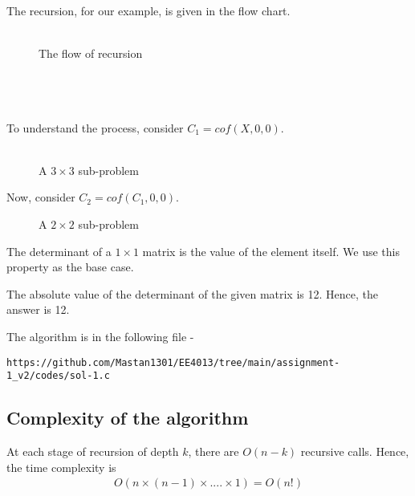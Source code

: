\documentclass[journal,12pt,twocolumn]{IEEEtran}
\begin{document}
The recursion, for our example, is given in the flow chart. \\ \\

\begin{figure}[h!]
	\begin{center}
		\resizebox{\columnwidth/1}{!}{}
	\end{center}
	\caption{The flow of recursion}
	\label{fig:fig1}
\end{figure}

\\ \\ \\ To understand the process, consider $C_1 = cof(X, 0, 0)$. \\ \\

\begin{figure}[h!]
	\begin{center}
		\resizebox{\columnwidth/1}{!}{}
	\end{center}
	\caption{A $3 \times 3$ sub-problem}
	\label{fig:fig2}
\end{figure}

Now, consider $C_2 = cof(C_1, 0, 0)$. 

\begin{figure}[h!]
	\begin{center}
		\resizebox{\columnwidth/1}{!}{}
	\end{center}
	\caption{A $2 \times 2$ sub-problem}
	\label{fig:fig3}
\end{figure}

The determinant of a $1 \times 1$ matrix is the value of the element itself. We use this property as the base case.

The absolute value of the determinant of the given matrix is 12. Hence, the answer is 12.

The algorithm is in the following file - 
\begin{lstlisting}
https://github.com/Mastan1301/EE4013/tree/main/assignment-1_v2/codes/sol-1.c
\end{lstlisting}

\subsection{Complexity of the algorithm}
At each stage of recursion of depth $k$, there are $O(n - k)$ recursive calls. Hence, the time complexity is 
    \begin{align*}
        O(n \times (n - 1) \times .... \times 1) = O(n!)
    \end{align*}
\end{document}
